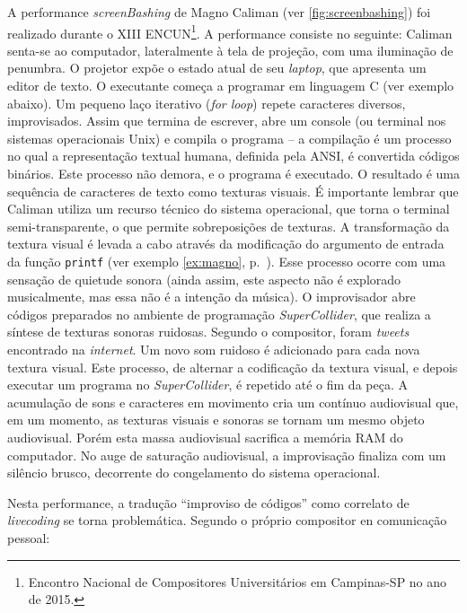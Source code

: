A performance \emph{screenBashing} de Magno Caliman (ver \autoref{fig:screenbashing}) foi realizado durante o XIII ENCUN\footnote{Encontro Nacional de Compositores Universitários em Campinas-SP no ano de 2015.}. A performance consiste no seguinte: Caliman senta-se ao computador, lateralmente à tela de projeção, com uma iluminação de penumbra. O projetor expõe o estado atual de seu \emph{laptop}, que apresenta um editor de texto. O executante começa a programar em linguagem C (ver exemplo abaixo). Um pequeno laço iterativo (\emph{for loop}) repete caracteres diversos, improvisados. Assim que termina de escrever, abre um console (ou terminal nos sistemas operacionais Unix) e compila o programa -- a compilação é um processo no qual a representação textual humana, definida pela ANSI, é convertida códigos binários. Este processo não demora, e o programa é executado. O resultado é uma sequência de caracteres de texto como texturas visuais. É importante lembrar que Caliman utiliza um recurso técnico do sistema operacional, que torna o terminal semi-transparente, o que permite sobreposições de texturas. A transformação da textura visual é levada a cabo através da modificação do argumento de entrada da função \verb|printf| (ver exemplo \ref{ex:magno}, p.~\pageref{ex:magno}). Esse processo ocorre com uma sensação de quietude sonora (ainda assim, este aspecto não é explorado musicalmente, mas essa não é a intenção da música). O improvisador abre códigos preparados no ambiente de programação  \emph{SuperCollider}, que realiza a síntese de texturas sonoras ruidosas. Segundo o compositor, foram \emph{tweets} encontrado na \emph{internet}. Um novo som ruidoso é adicionado para cada nova textura visual. Este processo, de alternar a codificação da textura visual, e depois executar um programa no \emph{SuperCollider}, é repetido até o fim da peça. A acumulação de sons e caracteres em movimento cria um contínuo audiovisual que, em um momento, as texturas visuais e sonoras se tornam um mesmo objeto audiovisual. Porém esta massa audiovisual sacrifica a memória RAM do computador. No auge de saturação audiovisual, a improvisação finaliza com um silêncio brusco, decorrente do congelamento do sistema operacional.


Nesta performance, a tradução ``improviso de códigos'' como correlato de \emph{livecoding}  se torna problemática. Segundo o próprio compositor en comunicação pessoal:

